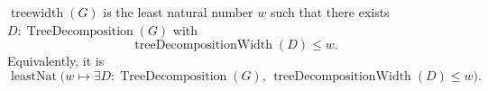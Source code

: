 \(\operatorname{treewidth}(G)\) is the least natural number \(w\) such that
there exists \(D:\operatorname{TreeDecomposition}(G)\) with
\[
  \operatorname{treeDecompositionWidth}(D)\le w.
\]
Equivalently, it is
\[
  \operatorname{leastNat}\bigl(w\mapsto
    \exists D:\operatorname{TreeDecomposition}(G),\,
      \operatorname{treeDecompositionWidth}(D)\le w\bigr).
\]
